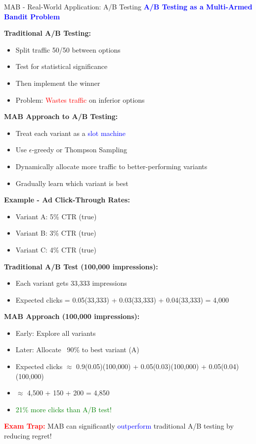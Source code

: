 \documentclass[8pt]{beamer}
\begin{document}
	\begin{frame}{MAB - Real-World Application: A/B Testing}
		\fontsize{6.5}{7.5}\selectfont
		\textcolor{blue}{\textbf{A/B Testing as a Multi-Armed Bandit Problem}}
		
		\textbf{Traditional A/B Testing:}
		\begin{itemize}
			\item Split traffic 50/50 between options
			\item Test for statistical significance
			\item Then implement the winner
			\item Problem: \textcolor{red}{Wastes traffic} on inferior options
		\end{itemize}
		
		\textbf{MAB Approach to A/B Testing:}
		\begin{itemize}
			\item Treat each variant as a \textcolor{blue}{slot machine}
			\item Use $\epsilon$-greedy or Thompson Sampling
			\item Dynamically allocate more traffic to better-performing variants
			\item Gradually learn which variant is best
		\end{itemize}
		
		\textbf{Example - Ad Click-Through Rates:}
		\begin{itemize}
			\item Variant A: 5\% CTR (true)
			\item Variant B: 3\% CTR (true)
			\item Variant C: 4\% CTR (true)
		\end{itemize}
		
		\textbf{Traditional A/B Test (100,000 impressions):}
		\begin{itemize}
			\item Each variant gets 33,333 impressions
			\item Expected clicks = 0.05(33,333) + 0.03(33,333) + 0.04(33,333) = 4,000
		\end{itemize}
		
		\textbf{MAB Approach (100,000 impressions):}
		\begin{itemize}
			\item Early: Explore all variants
			\item Later: Allocate ~90\% to best variant (A)
			\item Expected clicks $\approx$ 0.9(0.05)(100,000) + 0.05(0.03)(100,000) + 0.05(0.04)(100,000)
			\item $\approx$ 4,500 + 150 + 200 = 4,850
			\item \textcolor{green}{21\% more clicks than A/B test!}
		\end{itemize}
		
		\textcolor{red}{\textbf{Exam Trap:}} MAB can significantly \textcolor{blue}{outperform} traditional A/B testing by reducing regret!
	\end{frame}
	
\end{document}
